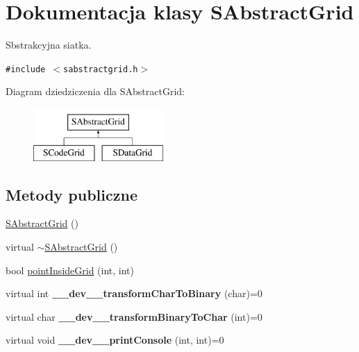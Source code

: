 \hypertarget{classSAbstractGrid}{
\section{Dokumentacja klasy SAbstractGrid}
\label{classSAbstractGrid}
}
Sbstrakcyjna siatka.  


{\tt \#include $<$sabstractgrid.h$>$}

Diagram dziedziczenia dla SAbstractGrid:\begin{figure}[H]
\begin{center}
\leavevmode
\includegraphics[height=2cm]{classSAbstractGrid}
\end{center}
\end{figure}
\subsection*{Metody publiczne}
\begin{CompactItemize}
\item 
\hyperlink{classSAbstractGrid_2df5b6a5bd2a11d9015104f3dd6afc20}{SAbstractGrid} ()
\item 
virtual \hyperlink{classSAbstractGrid_7391180cba323fbd0d64d23157c8a6a6}{$\sim$SAbstractGrid} ()
\item 
bool \hyperlink{classSAbstractGrid_1e4823efb8b482d44466d8324f63dfb1}{pointInsideGrid} (int, int)
\item 
\hypertarget{classSAbstractGrid_1c10a9c322c321b3fc2c9a5195e817ba}{
virtual int \textbf{\_\-\_\-dev\_\-\_\-transformCharToBinary} (char)=0}
\label{classSAbstractGrid_1c10a9c322c321b3fc2c9a5195e817ba}

\item 
\hypertarget{classSAbstractGrid_6fc913c575c7d1b87b422084129db978}{
virtual char \textbf{\_\-\_\-dev\_\-\_\-transformBinaryToChar} (int)=0}
\label{classSAbstractGrid_6fc913c575c7d1b87b422084129db978}

\item 
\hypertarget{classSAbstractGrid_e36c03b21a96f33d1ace5fd0b1d218f5}{
virtual void \textbf{\_\-\_\-dev\_\-\_\-printConsole} (int, int)=0}
\label{classSAbstractGrid_e36c03b21a96f33d1ace5fd0b1d218f5}

\end{CompactItemize}

